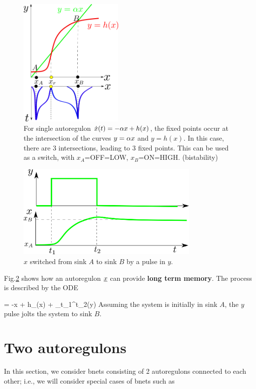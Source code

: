 \begin{figure}[h!]
\centering
\includegraphics[width=2in]
{autoregulons/source-sink-source.png}
\caption{For single autoregulon $\dot{x}(t)=-\alpha x + h(x)$, 
the fixed points occur at the intersection of the
curves $y=\alpha x$ and $y=h(x)$. In this case,
there are 3 intersections, leading to 3 fixed points. This can be used as a switch, with $x_A$=OFF=LOW, $x_B$=ON=HIGH. (bistability)
}
\label{fig-source-sink-source}
\end{figure}


\begin{figure}[h!]
\centering
\includegraphics[width=3.5in]
{autoregulons/x-y-memory.png}
\caption{$x$ switched from 
sink $A$ to sink $B$
by a pulse in $y$.}
\label{fig-x-y-memory}
\end{figure}

Fig.\ref{fig-x-y-memory}
shows how an autoregulon
$\rvx$ can 
provide {\bf long term memory}.
The process is described by the ODE

\beq
{}= -\alp x + h_\oplus(x) + \gamma\indi_{t_1}^{t_2}(y)
\eeq
Assuming the system is initially in sink $A$,
the $y$ pulse jolts the system to sink $B$.


\section{Two autoregulons}

In this section, we consider bnets
consisting of 2 autoregulons
connected to each other; i.e.,
we will consider
special cases of bnets such as

